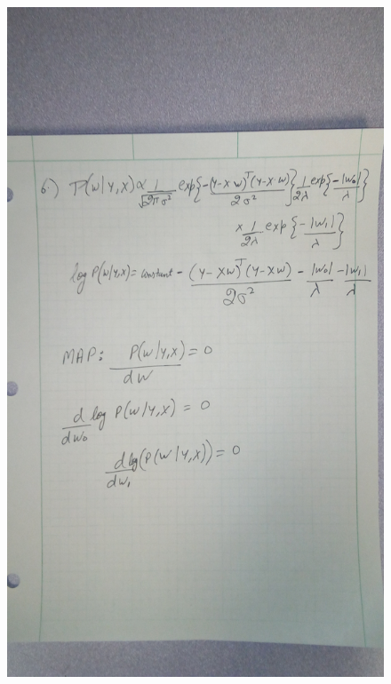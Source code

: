 \documentclass[fleqn]{article}
\begin{document}
\begin{adjustwidth}{4em}{0pt}
\begin{figure}
			\includegraphics[width=1.4\textwidth, angle=270]{hw9_q1_3.jpg}
		\end{figure}
		
	\end{adjustwidth}
	
\end{document}
